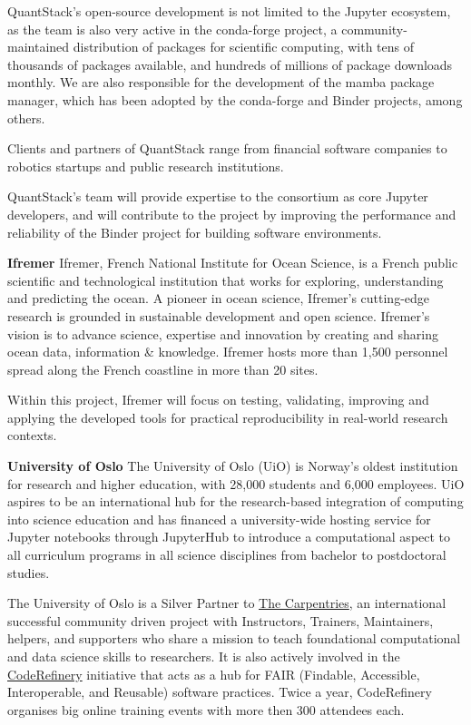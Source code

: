 QuantStack's open-source development is not limited to the Jupyter ecosystem, as the team
is also very active in the conda-forge project, a community-maintained distribution
of packages for scientific computing, with tens of thousands of packages available,
and hundreds of millions of package downloads monthly. We are also responsible for
the development of the mamba package manager, which has been adopted by the conda-forge
and Binder projects, among others.

Clients and partners of QuantStack range from financial software companies to robotics
startups and public research institutions.

QuantStack's team will provide expertise to the consortium as core Jupyter developers,
and will contribute to the project by improving the performance and reliability of the
Binder project for building software environments.

\noindent \textbf{Ifremer}
Ifremer, French National Institute for Ocean Science, is a French public
scientific and technological institution that works for exploring, understanding
and predicting the ocean. A pioneer in ocean science, Ifremer's cutting-edge
research is grounded in sustainable development and open science. Ifremer's
vision is to advance science, expertise and innovation by creating and sharing
ocean data, information \& knowledge. Ifremer hosts more than 1,500 personnel
spread along the French coastline in more than 20 sites.

Within this project, Ifremer will focus on testing, validating, improving and
applying the developed
tools for practical reproducibility in real-world research contexts.

\noindent \textbf{University of Oslo}
The University of Oslo (UiO) is Norway's oldest institution for research and
higher education, with 28,000 students and 6,000 employees. UiO aspires to be an
international hub for the research-based integration of computing into science
education and has financed a university-wide hosting service for Jupyter
notebooks through JupyterHub to introduce a computational aspect to all
curriculum programs in all science disciplines from bachelor to postdoctoral
studies.

The University of Oslo is a Silver Partner to \href{https://carpentries.org}{The
  Carpentries}, an international successful community driven project with
Instructors, Trainers, Maintainers, helpers, and supporters who share a mission
to teach foundational computational and data science skills to researchers. It
is also actively involved in the \href{https://coderefinery.org/}{CodeRefinery}
initiative that acts as a hub for FAIR (Findable, Accessible, Interoperable, and
Reusable) software practices. Twice a year, CodeRefinery organises big online
training events with more then 300 attendees each.

